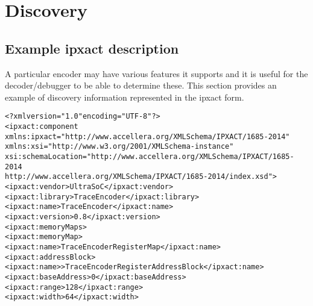 \chapter{Discovery}

\section{Example ipxact description}

A particular encoder may have various features it supports and it is
useful for the decoder/debugger to be able to determine these. This
section provides an example of discovery information represented in
the ipxact form.

\begin{alltt}
<?xml version="1.0" encoding="UTF-8"?>
<ipxact:component 
   xmlns:ipxact="http://www.accellera.org/XMLSchema/IPXACT/1685-2014"
   xmlns:xsi="http://www.w3.org/2001/XMLSchema-instance" 
   xsi:schemaLocation="http://www.accellera.org/XMLSchema/IPXACT/1685-2014
                         http://www.accellera.org/XMLSchema/IPXACT/1685-2014/index.xsd">
   <ipxact:vendor>UltraSoC</ipxact:vendor>
   <ipxact:library>TraceEncoder</ipxact:library>
   <ipxact:name>TraceEncoder</ipxact:name>
   <ipxact:version>0.8</ipxact:version>
   <ipxact:memoryMaps>
      <ipxact:memoryMap>
         <ipxact:name>Trace Encoder Register Map</ipxact:name>
         <ipxact:addressBlock>
            <ipxact:name>>Trace Encoder Register Address Block</ipxact:name>
            <ipxact:baseAddress>0</ipxact:baseAddress>
            <ipxact:range>128</ipxact:range>
            <ipxact:width>64</ipxact:width>


\end{alltt}
